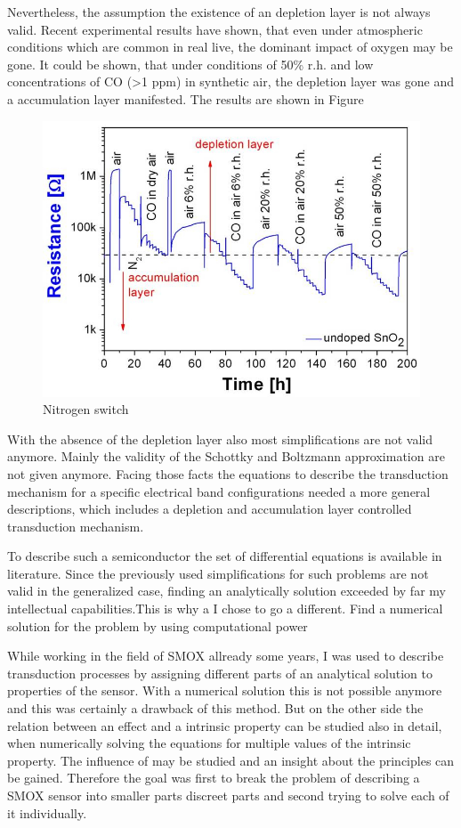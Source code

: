 \documentclass[11pt]{article}
\begin{document}
Nevertheless, the assumption the existence of an depletion layer is not
always valid. Recent experimental results have shown, that even under
atmospheric conditions which are common in real live, the dominant
impact of oxygen may be gone. It could be shown, that under conditions
of 50\% r.h. and low concentrations of CO (\textgreater1 ppm) in
synthetic air, the depletion layer was gone and a accumulation layer
manifested. The results are shown in Figure

\begin{figure}
\centering
\includegraphics{media/pics/external_plots/nitroline_switch_julia.jpg}
\caption{Nitrogen switch}
\end{figure}

With the absence of the depletion layer also most simplifications are
not valid anymore. Mainly the validity of the Schottky and Boltzmann
approximation are not given anymore. Facing those facts the equations to
describe the transduction mechanism for a specific electrical band
configurations needed a more general descriptions, which includes a
depletion and accumulation layer controlled transduction mechanism.

To describe such a semiconductor the set of differential equations is
available in literature. Since the previously used simplifications for
such problems are not valid in the generalized case, finding an
analytically solution exceeded by far my intellectual capabilities.This
is why a I chose to go a different. Find a numerical solution for the
problem by using computational power

While working in the field of SMOX allready some years, I was used to
describe transduction processes by assigning different parts of an
analytical solution to properties of the sensor. With a numerical
solution this is not possible anymore and this was certainly a drawback
of this method. But on the other side the relation between an effect and
a intrinsic property can be studied also in detail, when numerically
solving the equations for multiple values of the intrinsic property. The
influence of may be studied and an insight about the principles can be
gained. Therefore the goal was first to break the problem of describing
a SMOX sensor into smaller parts discreet parts and second trying to
solve each of it individually.
\end{document}
